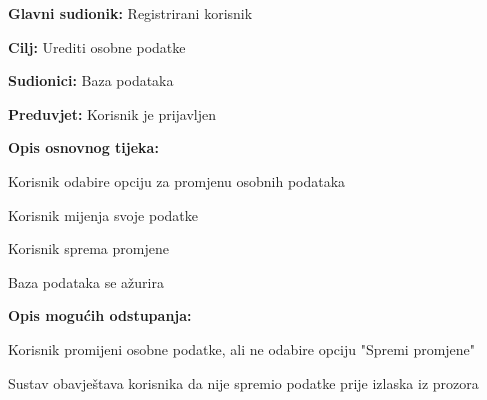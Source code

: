 	\noindent {}
	\begin{packed_item}
		
		\item \textbf{Glavni sudionik: }Registrirani korisnik
		\item  \textbf{Cilj:} Urediti osobne podatke
		\item  \textbf{Sudionici:} Baza podataka
		\item  \textbf{Preduvjet:} Korisnik je prijavljen
		\item  \textbf{Opis osnovnog tijeka:}
		
		\item[] \begin{packed_enum}
			
			\item  Korisnik odabire opciju za promjenu osobnih podataka
			\item Korisnik mijenja svoje podatke
			\item Korisnik sprema promjene
			\item Baza podataka se ažurira
			
		\end{packed_enum}
		
		\item  \textbf{Opis mogućih odstupanja:}
		
		\item[] \begin{packed_item}
			
			\item[2.a] Korisnik promijeni osobne podatke, ali ne odabire opciju "Spremi promjene"
			\item[] \begin{packed_enum}
				
				\item Sustav obavještava korisnika da nije spremio podatke prije izlaska iz prozora
				
			\end{packed_enum}
		\end{packed_item}
	\end{packed_item}

